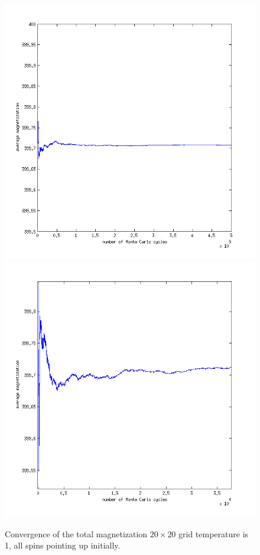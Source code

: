 \documentclass[a4paper,english, 10pt, twoside]{article}
\begin{document}
\begin{figure}[H]
\includegraphics[scale=0.45]{magnetization_ordered_temp1.png}
\includegraphics[scale=0.45]{magnetization_ordered_temp1_zoom.png}
\caption{Convergence of the total magnetization $20 \times 20$ grid temperature is 1, all spins pointing up initially.}
\label{magnet_ordered_temp1}
\end{figure}
\end{document}

